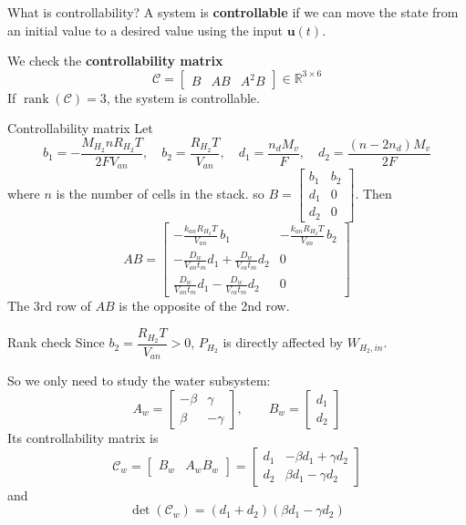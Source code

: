\documentclass[aspectratio=169]{beamer}
\begin{document}
\begin{frame}{What is controllability?}
    A system is \textbf{controllable} if we can move the state
    from an initial value to a desired value using the input $\mathbf{u}(t)$.

    \medskip
    We check the \textbf{controllability matrix}
    \[
        \mathcal{C} = \begin{bmatrix} B & AB & A^2B \end{bmatrix} \in \mathbb{R}^{3 \times 6}
    \]
    If $\operatorname{rank}(\mathcal{C}) = 3$, the system is controllable.
\end{frame}

\begin{frame}{Controllability matrix}
    Let
    \[
        b_1 = -\frac{M_{H_2}nR_{H_2}T}{2FV_{an}}, \quad
        b_2 = \frac{R_{H_2}T}{V_{an}}, \quad
        d_1 = \frac{n_d M_v}{F}, \quad
        d_2 = \frac{(n-2n_d)M_v}{2F}
    \]
    where $n$ is the number of cells in the stack.
    so $B = \begin{bmatrix}b_1 & b_2 \\ d_1 & 0 \\ d_2 & 0\end{bmatrix}$.
    Then
    \[
        AB = \begin{bmatrix}
            -\frac{k_{an}R_{H_2}T}{V_{an}}\,b_1 & -\frac{k_{an}R_{H_2}T}{V_{an}}\,b_2 \\[6pt]
            -\frac{D_w}{V_{an}t_m}d_1 + \frac{D_w}{V_{ca}t_m}d_2 & 0 \\[6pt]
             \frac{D_w}{V_{an}t_m}d_1 - \frac{D_w}{V_{ca}t_m}d_2 & 0
        \end{bmatrix}
    \]
    The 3rd row of $AB$ is the opposite of the 2nd row.
\end{frame}

\begin{frame}{Rank check}
    Since $b_2 = \dfrac{R_{H_2}T}{V_{an}} > 0$, $P_{H_2}$ is directly affected by $W_{H_2,in}$.

    \medskip
    So we only need to study the water subsystem:
    \[
        A_w = \begin{bmatrix}
            -\beta & \gamma \\
            \beta & -\gamma
        \end{bmatrix}, \qquad
        B_w = \begin{bmatrix} d_1 \\ d_2 \end{bmatrix}
    \]
    Its controllability matrix is
    \[
        \mathcal{C}_w = \begin{bmatrix} B_w & A_w B_w \end{bmatrix}
        = \begin{bmatrix}
            d_1 & -\beta d_1 + \gamma d_2 \\
            d_2 & \beta d_1 - \gamma d_2
        \end{bmatrix}
    \]
    and
    \[
        \det(\mathcal{C}_w) = (d_1 + d_2)(\beta d_1 - \gamma d_2)
    \]
\end{frame}
\end{document}
